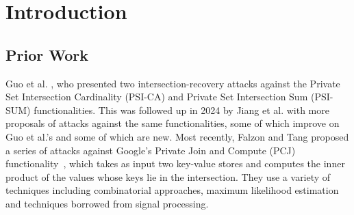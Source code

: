 \section{Introduction}


\subsection{Prior Work}

Guo et al. \cite{Guo22}, who presented two intersection-recovery attacks 
against the Private Set Intersection Cardinality (PSI-CA) and Private Set Intersection Sum (PSI-SUM) functionalities.
This was followed up in 2024 by Jiang et al. \cite{AnonPSI} with more proposals of attacks 
against the same functionalities,
some of which improve on Guo et al.'s and some of which are new. Most recently, Falzon and Tang \cite{U:FalTan25} proposed a series of attacks against Google's Private Join and Compute (PCJ) functionality~\cite{PJC}, which takes as input two key-value stores and computes the inner product of the values whose keys lie in the intersection. 
They use a variety of techniques including combinatorial approaches, maximum likelihood estimation and techniques borrowed from signal processing.
